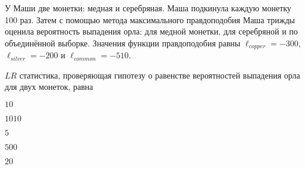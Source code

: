 
\begin{question}
У Маши две монетки: медная и серебряная. Маша подкинула каждую монетку 100 раз. Затем с помощью метода максимального правдоподобия
Маша трижды оценила вероятность выпадения орла: для медной монетки, для серебряной и по объединённой выборке.
Значения функции правдоподобия равны \(\ell_{copper} = -300\), \(\ell_{silver}=-200\) и \(\ell_{common} = -510\).

\(LR\) статистика, проверяющая гипотезу о равенстве вероятностей выпадения орла для двух монеток, равна
\begin{answerlist}
  \item \(10\)
  \item \(1010\)
  \item \(5\)
  \item \(500\)
  \item \(20\)
\end{answerlist}
\end{question}


